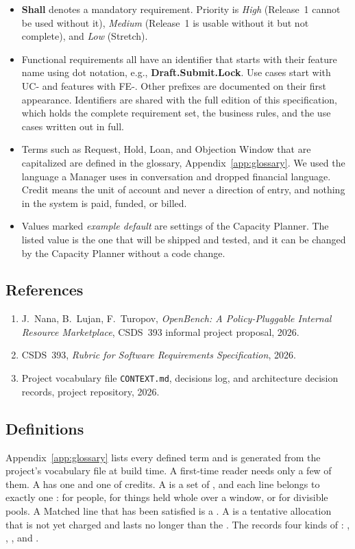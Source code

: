 \begin{itemize}
  \item \textbf{Shall} denotes a mandatory requirement. Priority is \emph{High} (Release~1 cannot be used without it), \emph{Medium} (Release~1 is usable without it but not complete), and \emph{Low} (Stretch).
  \item Functional requirements all have an identifier that starts with their feature name using dot notation, e.g., \textbf{Draft.Submit.Lock}. Use cases start with UC- and features with FE-. Other prefixes are documented on their first appearance. Identifiers are shared with the full edition of this specification, which holds the complete requirement set, the business rules, and the use cases written out in full.
  \item Terms such as Request, Hold, Loan, and Objection Window that are capitalized are defined in the glossary, Appendix~\ref{app:glossary}. We used the language a Manager uses in conversation and dropped financial language. Credit means the unit of account and never a direction of entry, and nothing in the system is paid, funded, or billed.
  \item Values marked \emph{example default} are settings of the Capacity Planner. The listed value is the one that will be shipped and tested, and it can be changed by the Capacity Planner without a code change.
\end{itemize}

\subsection{References}

\begin{enumerate}
  \item J.~Nana, B.~Lujan, F.~Turopov, \emph{OpenBench: A Policy-Pluggable Internal Resource Marketplace}, CSDS~393 informal project proposal, 2026.
  \item CSDS~393, \emph{Rubric for Software Requirements Specification}, 2026.
  \item Project vocabulary file \texttt{CONTEXT.md}, decisions log, and architecture decision records, project repository, 2026.
\end{enumerate}

\subsection{Definitions}

Appendix~\ref{app:glossary} lists every defined term and is generated from the project's vocabulary file at build time. A first-time reader needs only a few of them. A  has one  and one  of credits. A  is a set of , and each line belongs to exactly one :  for people,  for things held whole over a window, or  for divisible pools. A Matched line that has been satisfied is a . A  is a tentative allocation that is not yet charged and lasts no longer than the . The  records four kinds of : , , , and .
